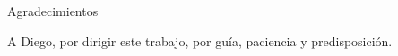 
\thispagestyle{empty}


\vspace*{3cm}

\Large{Agradecimientos}

A Diego, por dirigir este trabajo, por guía, paciencia y predisposición.